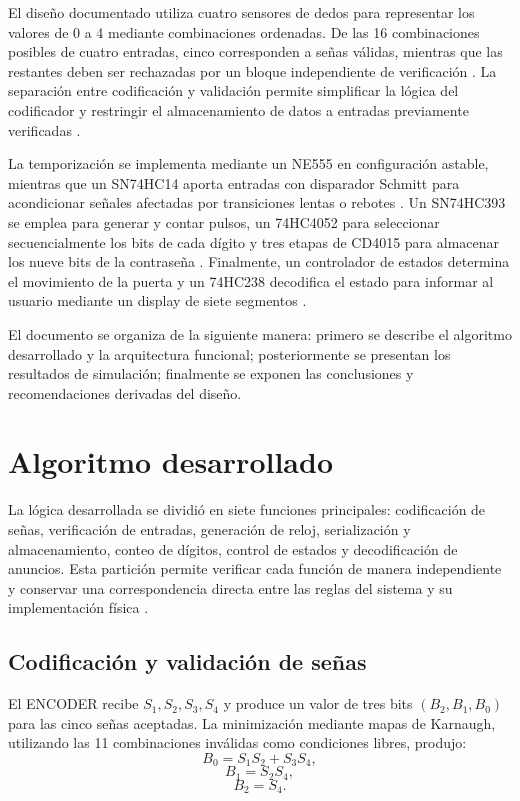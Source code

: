 \documentclass[10pt,journal]{IEEEtran}
\begin{document}
El diseño documentado utiliza cuatro sensores de dedos para representar los valores de 0 a 4 mediante combinaciones ordenadas. De las 16 combinaciones posibles de cuatro entradas, cinco corresponden a señas válidas, mientras que las restantes deben ser rechazadas por un bloque independiente de verificación \cite{bitacora}. La separación entre codificación y validación permite simplificar la lógica del codificador y restringir el almacenamiento de datos a entradas previamente verificadas \cite{bitacora}.

La temporización se implementa mediante un NE555 en configuración astable, mientras que un SN74HC14 aporta entradas con disparador Schmitt para acondicionar señales afectadas por transiciones lentas o rebotes \cite{ne555,hc14}. Un SN74HC393 se emplea para generar y contar pulsos, un 74HC4052 para seleccionar secuencialmente los bits de cada dígito y tres etapas de CD4015 para almacenar los nueve bits de la contraseña \cite{hc393,hc4052,cd4015}. Finalmente, un controlador de estados determina el movimiento de la puerta y un 74HC238 decodifica el estado para informar al usuario mediante un display de siete segmentos \cite{hc238}.

El documento se organiza de la siguiente manera: primero se describe el algoritmo desarrollado y la arquitectura funcional; posteriormente se presentan los resultados de simulación; finalmente se exponen las conclusiones y recomendaciones derivadas del diseño.

\section{Algoritmo desarrollado}

La lógica desarrollada se dividió en siete funciones principales: codificación de señas, verificación de entradas, generación de reloj, serialización y almacenamiento, conteo de dígitos, control de estados y decodificación de anuncios. Esta partición permite verificar cada función de manera independiente y conservar una correspondencia directa entre las reglas del sistema y su implementación física \cite{bitacora}.

\subsection{Codificación y validación de señas}
El ENCODER recibe $S_1,S_2,S_3,S_4$ y produce un valor de tres bits $(B_2,B_1,B_0)$ para las cinco señas aceptadas. La minimización mediante mapas de Karnaugh, utilizando las 11 combinaciones inválidas como condiciones libres, produjo:
\begin{equation}
B_0=S_1S_2+S_3S_4,
\end{equation}
\begin{equation}
B_1=S_2S_4,
\end{equation}
\begin{equation}
B_2=S_4.
\end{equation}
\end{document}
